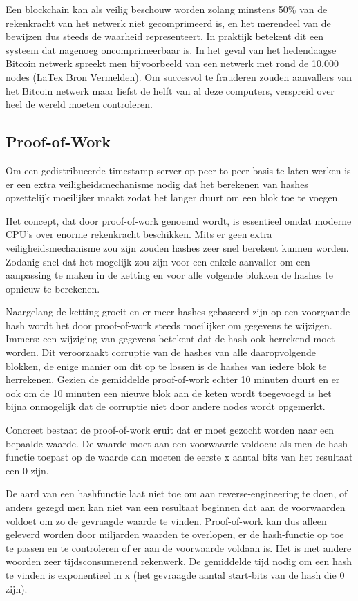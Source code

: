 	Een blockchain kan als veilig beschouw worden zolang minstens 50\% van de rekenkracht van het netwerk niet gecomprimeerd is, en het merendeel van de bewijzen dus steeds de waarheid representeert. In praktijk betekent dit een systeem dat nagenoeg oncomprimeerbaar is. In het geval van het hedendaagse Bitcoin netwerk spreekt men bijvoorbeeld van een netwerk met rond de 10.000 nodes (LaTex Bron Vermelden). Om succesvol te frauderen zouden aanvallers van het Bitcoin netwerk maar liefst de helft van al deze computers, verspreid over heel de wereld moeten controleren. 
			
	\subsection{Proof-of-Work}
	\label{subsec:pow}
	Om een gedistribueerde timestamp server op peer-to-peer basis te laten werken is er een extra veiligheidsmechanisme nodig dat het berekenen van hashes opzettelijk moeilijker maakt zodat het langer duurt om een blok toe te voegen. 
	
	Het concept, dat door \textcite{Nakamoto2008} proof-of-work genoemd wordt, is essentieel omdat moderne CPU’s over enorme rekenkracht beschikken. Mits er geen extra veiligheidsmechanisme zou zijn zouden hashes zeer snel berekent kunnen worden. Zodanig snel dat het mogelijk zou zijn voor een enkele aanvaller om een aanpassing te maken in de ketting en voor alle volgende blokken de hashes te opnieuw te berekenen. 
	
	Naargelang de ketting groeit en er meer hashes gebaseerd zijn op een voorgaande hash wordt het door proof-of-work steeds moeilijker om gegevens te wijzigen. Immers: een wijziging van gegevens betekent dat de hash ook herrekend moet worden. Dit veroorzaakt corruptie van de hashes van alle daaropvolgende blokken, de enige manier om dit op te lossen is de hashes van iedere blok te herrekenen. 
	Gezien de gemiddelde proof-of-work echter 10 minuten duurt en er ook om de 10 minuten een nieuwe blok aan de keten wordt toegevoegd is het bijna onmogelijk dat de corruptie niet door andere nodes wordt opgemerkt.
	
	Concreet bestaat de proof-of-work eruit dat er moet gezocht worden naar een bepaalde waarde. De waarde moet aan een voorwaarde voldoen: als men de hash functie toepast op de waarde dan moeten de eerste x aantal bits van het resultaat een 0 zijn. 
	
	De aard van een hashfunctie laat niet toe om aan reverse-engineering te doen, of anders gezegd men kan niet van een resultaat beginnen dat aan de voorwaarden voldoet om zo de gevraagde waarde te vinden. Proof-of-work kan dus alleen geleverd worden door miljarden waarden te overlopen, er de hash-functie op toe te passen en te controleren of er aan de voorwaarde voldaan is. Het is met andere woorden zeer tijdsconsumerend rekenwerk. De gemiddelde tijd nodig om een hash te vinden is exponentieel in x (het gevraagde aantal start-bits van de hash die 0 zijn).
	
